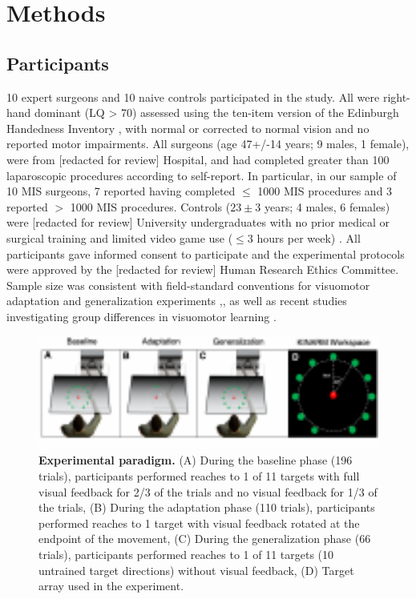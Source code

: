 \documentclass[man, 11pt, longtable, floatsintext, notab]{apa6}
\begin{document}
\section{Methods}
\subsection{Participants}
10 expert surgeons and 10 naive controls participated in the
study. All were right-hand dominant (LQ > 70) assessed using
the ten-item version of the Edinburgh Handedness Inventory
\cite{oldfield_assessment_1971}, with normal or corrected to
normal vision and no reported motor impairments. All
surgeons (age 47+/-14 years; 9 males, 1 female), were from
[redacted for review] Hospital, and had completed greater
than 100 laparoscopic procedures according to self-report. In
particular, in our sample of 10 MIS surgeons, 7 reported
having completed $\leq$ 1000 MIS procedures and 3 reported $>$ 1000 MIS procedures. Controls ($23\pm3$ years; 4
males, 6 females) were [redacted for review] University
undergraduates with no prior medical or surgical training
and limited video game use ($\leq 3$ hours per week)
\cite{gozli_effect_2014}\cite{lynch_video_2010}\cite{li_playing_2016}.
All participants gave informed consent to participate and
the experimental protocols were approved by the [redacted
for review] Human Research Ethics Committee. Sample size was
consistent with field-standard conventions for visuomotor
adaptation and generalization experiments
\cite{krakauer_learning_2000},\cite{krakauer_independent_1999},\cite{brayanov_motor_2012}
as well as recent studies investigating group differences in
visuomotor learning \cite{leukel_experts_2015}.
\begin{figure}[h]
  \centering
  \includegraphics[width=1.0\textwidth]{figures/fig_1.pdf}
  \caption{\scriptsize
    \textbf{Experimental paradigm.} (A) During the baseline
    phase (196 trials), participants performed reaches to 1 of
    11 targets with full visual feedback for 2/3 of the trials
    and no visual feedback for 1/3 of the trials, (B) During the
    adaptation phase (110 trials), participants performed
    reaches to 1 target with visual feedback rotated at the
    endpoint of the movement, (C) During the generalization
    phase (66 trials), participants performed reaches to 1 of 11
    targets (10 untrained target directions) without visual
    feedback, (D) Target array used in the experiment.
  }
  \label{fig_paradigm}
\end{figure}
\end{document}
